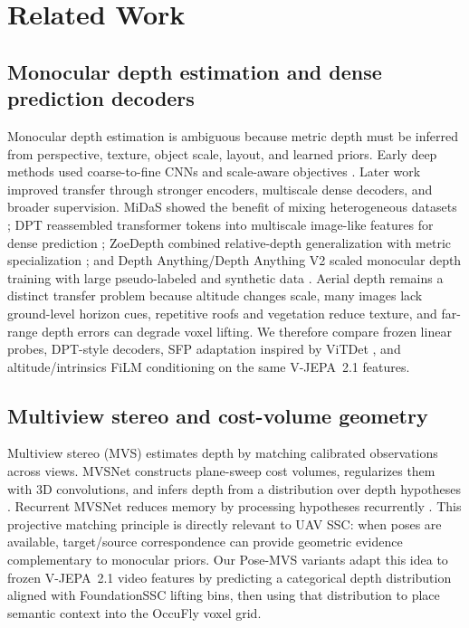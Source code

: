 \section{Related Work}
\label{sec:related_work}

\subsection{Monocular depth estimation and dense prediction decoders}
Monocular depth estimation is ambiguous because metric depth must be inferred from perspective, texture, object scale, layout, and learned priors. Early deep methods used coarse-to-fine CNNs and scale-aware objectives \cite{eigen2014depth}. Later work improved transfer through stronger encoders, multiscale dense decoders, and broader supervision. MiDaS showed the benefit of mixing heterogeneous datasets \cite{ranftl2020robust}; DPT reassembled transformer tokens into multiscale image-like features for dense prediction \cite{ranftl2021dpt}; ZoeDepth combined relative-depth generalization with metric specialization \cite{bhat2023zoedepth}; and Depth Anything/Depth Anything V2 scaled monocular depth training with large pseudo-labeled and synthetic data \cite{yang2024depthanything,yang2024depthanythingv2}. Aerial depth remains a distinct transfer problem because altitude changes scale, many images lack ground-level horizon cues, repetitive roofs and vegetation reduce texture, and far-range depth errors can degrade voxel lifting. We therefore compare frozen linear probes, DPT-style decoders, SFP adaptation inspired by ViTDet \cite{li2022vitdet}, and altitude/intrinsics FiLM conditioning \cite{perez2018film} on the same V-JEPA~2.1 features.

\subsection{Multiview stereo and cost-volume geometry}
Multiview stereo (MVS) estimates depth by matching calibrated observations across views. MVSNet constructs plane-sweep cost volumes, regularizes them with 3D convolutions, and infers depth from a distribution over depth hypotheses \cite{yao2018mvsnet}. Recurrent MVSNet reduces memory by processing hypotheses recurrently \cite{yao2019recurrentmvsnet}. This projective matching principle is directly relevant to UAV SSC: when poses are available, target/source correspondence can provide geometric evidence complementary to monocular priors. Our Pose-MVS variants adapt this idea to frozen V-JEPA~2.1 video features by predicting a categorical depth distribution aligned with FoundationSSC lifting bins, then using that distribution to place semantic context into the OccuFly voxel grid.

